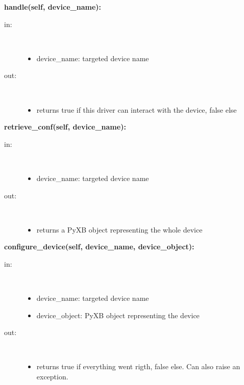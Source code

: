 \textbf{handle(self, device\_name):}
\begin{description}
    \item[in:] \hfill \\
        \begin{itemize}
            \item device\_name: targeted device name
        \end{itemize}
    \item[out:] \hfill \\
        \begin{itemize}
            \item returns true if this driver can interact with the device, false else
        \end{itemize}
\end{description}
\textbf{retrieve\_conf(self, device\_name):}
\begin{description}
    \item[in:] \hfill \\
        \begin{itemize}
            \item device\_name: targeted device name
        \end{itemize}
    \item[out:] \hfill \\
        \begin{itemize}
            \item returns a PyXB object representing the whole device
        \end{itemize}
\end{description}
\textbf{configure\_device(self, device\_name, device\_object):}
\begin{description}
    \item[in:] \hfill \\
        \begin{itemize}
            \item device\_name: targeted device name
            \item device\_object: PyXB object representing the device
        \end{itemize}
    \item[out:] \hfill \\
        \begin{itemize}
            \item returns true if everything went rigth, false else. Can also raise an exception.
        \end{itemize}
\end{description}

